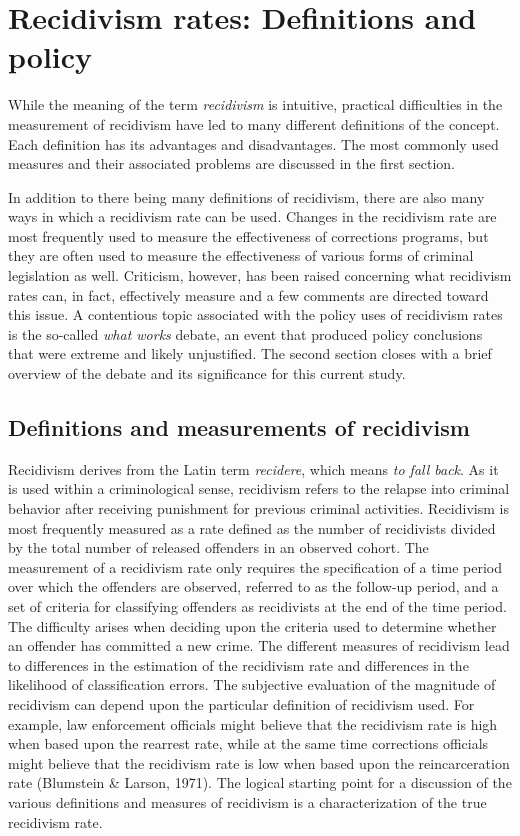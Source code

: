 \chapter{Recidivism rates: Definitions and policy}

While the meaning of the term \emph{recidivism} is intuitive, practical difficulties in the measurement of recidivism have led to many different definitions of the concept. Each definition has its advantages and disadvantages.  The most commonly used measures and their associated problems are discussed in the first section.

In addition to there being many definitions of recidivism, there are also many ways in which a recidivism rate can be used.  Changes in the recidivism rate are most frequently used to measure the effectiveness of corrections programs, but they are often used to measure the effectiveness of various forms of criminal legislation as well.  Criticism, however, has been raised concerning what recidivism rates can, in fact, effectively measure and a few comments are directed toward this issue.  A contentious topic associated with the policy uses of recidivism rates is the so-called \emph{what works} debate, an event that produced policy conclusions that were extreme and likely unjustified.  The second section closes with a brief overview of the debate and its significance for this current study.

\section{Definitions and measurements of recidivism}

Recidivism derives from the Latin term \emph{recidere}, which means \emph{to fall back}.  As it is used within a criminological sense, recidivism refers to the relapse into criminal behavior after receiving punishment for previous criminal activities.  Recidivism is most frequently measured as a rate defined as the number of recidivists divided by the total number of released offenders in an observed cohort.  The measurement of a recidivism rate only requires the specification of a time period over which the offenders are observed, referred to as the follow-up period, and a set of criteria for classifying offenders as recidivists at the end of the time period.  The difficulty arises when deciding upon the criteria used to determine whether an offender has committed a new crime.  The different measures of recidivism lead to differences in the estimation of the recidivism rate and differences in the likelihood of classification errors.  The subjective evaluation of the magnitude of recidivism can depend upon the particular definition of recidivism used.  For example, law enforcement officials might believe that the recidivism rate is high when based upon the rearrest rate, while at the same time corrections officials might believe that the recidivism rate is low when based upon the reincarceration rate (Blumstein \& Larson, 1971).  The logical starting point for a discussion of the various definitions and measures of recidivism is a characterization of the true recidivism rate.

